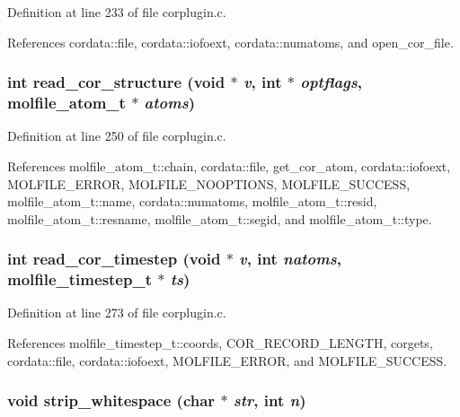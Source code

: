 Definition at line 233 of file corplugin.c.

References cordata::file, cordata::iofoext, cordata::numatoms, and open\_\-cor\_\-file.
\subsubsection{\setlength{\rightskip}{0pt plus 5cm}int read\_\-cor\_\-structure (void $\ast$ {\em v}, int $\ast$ {\em optflags}, {\bf molfile\_\-atom\_\-t} $\ast$ {\em atoms})\hspace{0.3cm}{\tt  [static]}}\label{corplugin_8c_a7}




Definition at line 250 of file corplugin.c.

References molfile\_\-atom\_\-t::chain, cordata::file, get\_\-cor\_\-atom, cordata::iofoext, MOLFILE\_\-ERROR, MOLFILE\_\-NOOPTIONS, MOLFILE\_\-SUCCESS, molfile\_\-atom\_\-t::name, cordata::numatoms, molfile\_\-atom\_\-t::resid, molfile\_\-atom\_\-t::resname, molfile\_\-atom\_\-t::segid, and molfile\_\-atom\_\-t::type.
\subsubsection{\setlength{\rightskip}{0pt plus 5cm}int read\_\-cor\_\-timestep (void $\ast$ {\em v}, int {\em natoms}, {\bf molfile\_\-timestep\_\-t} $\ast$ {\em ts})\hspace{0.3cm}{\tt  [static]}}\label{corplugin_8c_a8}




Definition at line 273 of file corplugin.c.

References molfile\_\-timestep\_\-t::coords, COR\_\-RECORD\_\-LENGTH, corgets, cordata::file, cordata::iofoext, MOLFILE\_\-ERROR, and MOLFILE\_\-SUCCESS.
\subsubsection{\setlength{\rightskip}{0pt plus 5cm}void strip\_\-whitespace (char $\ast$ {\em str}, int {\em n})\hspace{0.3cm}{\tt  [static]}}\label{corplugin_8c_a2}




